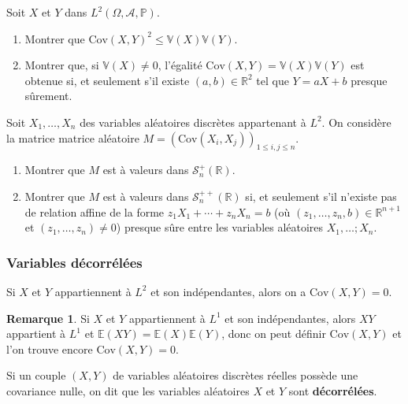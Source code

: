 \documentclass[french]{article}
\renewcommand{\P}{\mathbb{P}}
\newcommand{\R}{\mathbb{R}}
\newcommand{\E}{\mathbb{E}}
\newcommand{\V}{\mathbb{V}}
\theoremstyle{plain}
\theoremstyle{definition}
\newtheorem*{rmq}{Remarque}
\theoremstyle{remark}
\begin{document}
\begin{exo}
	Soit $X$ et $Y$ dans $L^2(\Omega,\mathcal{A},\P)$.
	\begin{enumerate}
		\item Montrer que $\text{Cov}(X,Y)^2\leqslant\V(X)\V(Y)$.
		\item Montrer que, si $\V(X)\ne0$, l'égalité $\text{Cov}(X,Y)=\V(X)\V(Y)$ est obtenue si, et seulement s'il existe $(a,b)\in\R^2$ tel que $Y=aX+b$ presque sûrement.
	\end{enumerate}
\end{exo}

\begin{exo}
	Soit $X_1,\ldots,X_n$ des variables aléatoires discrètes appartenant à $L^2$. On considère la matrice matrice aléatoire $M=(\text{Cov}(X_i,X_j))_{1\leqslant i,j\leqslant n}$.
	\begin{enumerate}
		\item Montrer que $M$ est à valeurs dans $\mathcal{S}_n^+(\R)$.
		\item Montrer que $M$ est à valeurs dans $\mathcal{S}_n^{++}(\R)$ si, et seulement s'il n'existe pas de relation affine de la forme $z_1X_1+\cdots+z_nX_n=b$ (où $(z_1,\ldots,z_n,b)\in\R^{n+1}$ et $(z_1,\ldots,z_n)\ne0$) presque sûre entre les variables aléatoires $X_1,\ldots;X_n$.
	\end{enumerate}
\end{exo}

\subsubsection*{Variables décorrélées}

\begin{prop}%
	Si $X$ et $Y$ appartiennent à $L^2$ et son indépendantes, alors on a $\text{Cov}(X,Y)=0$.
\end{prop}

\begin{rmq}
	Si $X$ et $Y$ appartiennent à $L^1$ et son indépendantes, alors $XY$ appartient à $L^1$ et $\E(XY)=\E(X)\E(Y)$, donc on peut définir $\text{Cov}(X,Y)$ et l'on trouve encore $\text{Cov}(X,Y)=0$.
\end{rmq}

\begin{dfn}
	Si un couple $(X,Y)$ de variables aléatoires discrètes réelles possède une covariance nulle, on dit que les variables aléatoires $X$ et $Y$ sont \textbf{décorrélées}.
\end{dfn}
\end{document}
